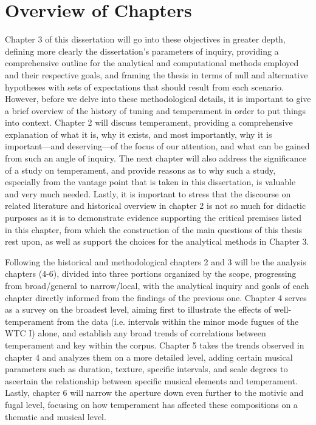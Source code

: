     \section{Overview of Chapters}\label{overview-of-chapters}

Chapter 3 of this dissertation will go into these objectives in greater
depth, defining more clearly the dissertation's parameters of inquiry,
providing a comprehensive outline for the analytical and computational
methods employed and their respective goals, and framing the thesis in
terms of null and alternative hypotheses with sets of expectations that
should result from each scenario. However, before we delve into these
methodological details, it is important to give a brief overview of the
history of tuning and temperament in order to put things into context.
Chapter 2 will discuss temperament, providing a comprehensive
explanation of what it is, why it exists, and most importantly, why it
is important---and deserving---of the focus of our attention, and what
can be gained from such an angle of inquiry. The next chapter will also
address the significance of a study on temperament, and provide reasons
as to why such a study, especially from the vantage point that is taken
in this dissertation, is valuable and very much needed. Lastly, it is
important to stress that the discourse on related literature and
historical overview in chapter 2 is not so much for didactic purposes as
it is to demonstrate evidence supporting the critical premises listed in
this chapter, from which the construction of the main questions of this
thesis rest upon, as well as support the choices for the analytical
methods in Chapter 3.

Following the historical and methodological chapters 2 and 3 will be the
analysis chapters (4-6), divided into three portions organized by the
scope, progressing from broad/general to narrow/local, with the
analytical inquiry and goals of each chapter directly informed from the
findings of the previous one. Chapter 4 serves as a survey on the
broadest level, aiming first to illustrate the effects of
well-temperament from the data (i.e. intervals within the minor mode
fugues of the WTC I) alone, and establish any broad trends of
correlations between temperament and key within the corpus. Chapter 5
takes the trends observed in chapter 4 and analyzes them on a more
detailed level, adding certain musical parameters such as duration,
texture, specific intervals, and scale degrees to ascertain the
relationship between specific musical elements and temperament. Lastly,
chapter 6 will narrow the aperture down even further to the motivic and
fugal level, focusing on how temperament has affected these compositions
on a thematic and musical level.


